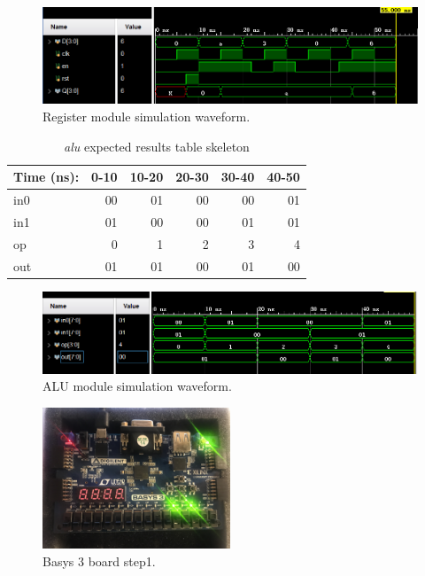 \documentclass[11pt]{article}
\begin{document}
\begin{figure}[ht]\centering
	\includegraphics[width=1\textwidth]{register_result.PNG}
	\caption{Register module simulation waveform.}
	\label{fig:register wave}
\end{figure}

\begin{table}[ht]\centering
	\caption{\textit{alu} expected results table skeleton}
	\label{ALU:tbl:alu_ERT}\medskip
	\begin{tabular}{l|rrrrr}
		Time (ns): & 0-10 & 10-20 & 20-30 & 30-40 & 40-50 \\
		\midrule
		in0 & 00 & 01  & 00 & 00 &  01\\
		in1 & 01 & 00 & 00 & 01 & 01  \\
		op	& 0 & 1 & 2 & 3 & 4 \\
		\midrule
		out & 01 & 01 & 00 & 01 & 00 \\
		\bottomrule
	\end{tabular}
\end{table}

\begin{figure}[ht]\centering
	\includegraphics[width=1\textwidth]{alu_result.PNG}
	\caption{ALU module simulation waveform.}
	\label{fig:ALU wave}
\end{figure}

\begin{figure}[ht]\centering
	\includegraphics[width=0.5\textwidth]{firststep}
	\caption{Basys 3 board step1.}
	\label{fig:step 1 of board}
\end{figure}
\end{document}
